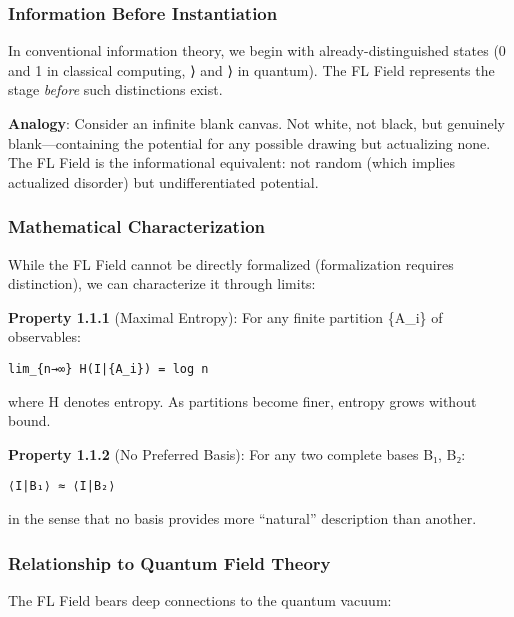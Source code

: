 \subsubsection{Information Before
Instantiation}\label{information-before-instantiation}

In conventional information theory, we begin with already-distinguished
states (0 and 1 in classical computing, ⟩ and ⟩ in
quantum). The FL Field represents the stage \emph{before} such
distinctions exist.

\textbf{Analogy}: Consider an infinite blank canvas. Not white, not
black, but genuinely blank---containing the potential for any possible
drawing but actualizing none. The FL Field is the informational
equivalent: not random (which implies actualized disorder) but
undifferentiated potential.

\subsubsection{Mathematical
Characterization}\label{mathematical-characterization}

While the FL Field cannot be directly formalized (formalization requires
distinction), we can characterize it through limits:

\textbf{Property 1.1.1} (Maximal Entropy): For any finite partition
\{A\_i\} of observables:

\begin{verbatim}
lim_{n→∞} H(I|{A_i}) = log n
\end{verbatim}

where H denotes entropy. As partitions become finer, entropy grows
without bound.

\textbf{Property 1.1.2} (No Preferred Basis): For any two complete bases
B₁, B₂:

\begin{verbatim}
⟨I|B₁⟩ ≈ ⟨I|B₂⟩
\end{verbatim}

in the sense that no basis provides more ``natural'' description than
another.

\subsubsection{Relationship to Quantum Field
Theory}\label{relationship-to-quantum-field-theory}

The FL Field bears deep connections to the quantum vacuum:

